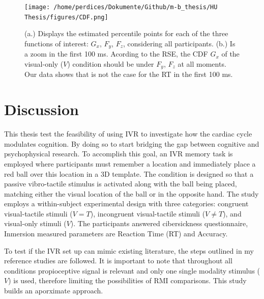 \documentclass[12pt,oneside,openright]{report}
\begin{document}
\begin{figure}[!ht]
    \centering
    \texttt{[image: /home/perdices/Dokumente/Github/m-b\_thesis/HU Thesis/figures/CDF.png]}
    \caption{ (a.) Displays the estimated percentile points for each of the three functions of interest: $G_x$, $F_y$, $F_z$, considering all participants. (b.) Is a zoom in the first 100 ms. Acording to the RSE, the CDF $G_x$ of the visual-only ($V$) condition should be under $F_y$, $F_z$ at all moments. Our data shows that is not the case for the RT in the first 100 ms.}
    \label{fig:CDF}
\end{figure}


\section*{Discussion}

This thesis test the feasibility of using IVR to investigate how the cardiac cycle modulates cognition. By doing so to start bridging the gap between cognitive and psychophysical research. To accomplish this goal, an IVR memory task is employed where participants must remember a location and immediately place a red ball over this location in a 3D template. The condition is designed so that a passive vibro-tactile stimulus is activated along with the ball being placed, matching either the visual location of the ball or in the opposite hand. The study employs a within-subject experimental design with three categories: congruent visual-tactile stimuli ($V=T$), incongruent visual-tactile stimuli ($V \neq T$), and visual-only stimuli ($V$). The participants answered cibersickness questionnaire, Inmersion measured parameters are Reaction Time (RT) and Accuracy.

To test if the IVR set up can mimic existing literature, the steps outlined in my reference studies \parencite{Innes2019ACA, SALTAFOSSI2023108642, Ulrich2007} are followed. It is important to note that throughout all conditions propioceptive signal is relevant and only one single modality stimulus ($V$) is used, therefore limiting the possibilities of RMI comparisons. This study builds an aporximate approach.
\end{document}
